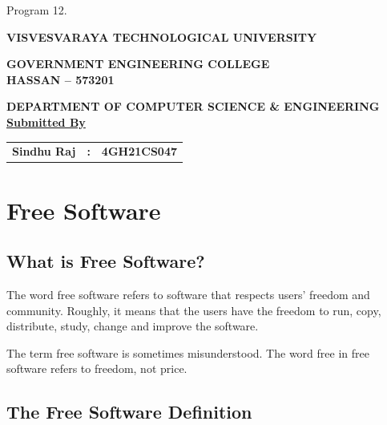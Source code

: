 Program 12.                   \documentclass[12pt]{report}
\begin{document}
	

\begin{titlepage}
\centering

\vspace*{0.5cm}

\LARGE{\bf VISVESVARAYA TECHNOLOGICAL UNIVERSITY}

\vspace{1cm}

\large{\textbf{GOVERNMENT ENGINEERING COLLEGE\\[0.2cm]
HASSAN – 573201\\[0.3cm]}}

\vspace{0.5cm}

\textbf{DEPARTMENT OF COMPUTER SCIENCE \& ENGINEERING}\\[5cm]

\textbf{\underline{\large Submitted By}}\\[0.3cm]

\begin{tabular}{l c l}

\textbf{Sindhu Raj} & \textbf{:} & \textbf{4GH21CS047}\\

\end{tabular}

\end{titlepage}

	
	\tableofcontents
	\listoffigures
	

\chapter{ Free Software}

\section{What is Free Software?}

The word free software refers to software that respects
users' freedom and community. Roughly, it means that
the users have the freedom to run, copy, distribute,
study, change and improve the software.

The term free software is sometimes misunderstood.
The word free in free software refers to freedom,
not price.

\section{The Free Software Definition}
\end{document}
